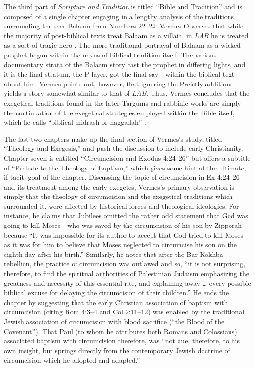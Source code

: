 The third part of \emph{Scripture and Tradition} is titled ``Bible and
Tradition'' and is composed of a single chapter engaging in a lengthy
analysis of the traditions surrounding the seer Balaam from Numbers
22--24. Vermes Observes that while the majority of post-biblical texts
treat Balaam as a villain, in \emph{LAB} he is treated as a sort of
tragic hero \autocite[173]{vermes1961}. The more traditional portrayal
of Balaam as a wicked prophet began within the nexus of biblical
tradition itself. The various documentary strata of the Balaam story
cast the prophet in differing lights, and it is the final stratum, the P
layer, got the final say---within the biblical text---about him. Vermes
points out, however, that ignoring the Preistly additions yields a story
somewhat similar to that of \emph{LAB}. Thus, Vermes concludes that the
exegetical traditions found in the later Targums and rabbinic works are
simply the continuation of the exegetical strategies employed within the
Bible itself, which he calls ``biblical midrash or haggadah''
\autocite[176]{vermes1961}.

The last two chapters make up the final section of Vermes's study,
titled ``Theology and Exegesis,'' and push the discussion to include
early Christianity. Chapter seven is entitled ``Circumcision and Exodus
4:24--26'' but offers a subtitle of ``Prelude to the Theology of
Baptism,'' which gives some hint at the ultimate, if tacit, goal of the
chapter. Discussing the topic of circumcision in Ex 4:24--26 and its
treatment among the early exegetes, Vermes's primary observation is
simply that the theology of circumcision and the exegetical traditions
which surrounded it, were affected by historical forces and theological
ideologies. For instance, he claims that Jubilees omitted the rather odd
statement that God was going to kill Moses---who was saved by the
circumcision of his son by Zipporah---because ``It was impossible for
its author to accept that God tried to kill Moses as it was for him to
believe that Moses neglected to circumcise his son on the eighth day
after his birth.''\autocite[185]{vermes1961} Similarly, he notes that
after the Bar Kokhba rebellion, the practice of circumcision was
outlawed and so, ``it is not surprising, therefore, to find the
spiritual authorities of Palestinian Judaism emphasizing the greatness
and necessity of this essential rite, and explaining away \ldots{} every
possible biblical excuse for delaying the circumcision of their
children.''\autocite[189]{vermes1961} He ends the chapter by suggesting
that the early Christian association of baptism with circumcision
(citing Rom 4:3--4 and Col 2:11--12) was enabled by the traditional
Jewish association of circumcision with blood sacrifice (``the Blood of
the Covenant'')\autocite[190]{vermes1961}. That Paul (to whom he
attributes both Romans and Colossians) associated baptism with
circumcision therefore, was ``not due, therefore, to his own insight,
but springs directly from the contemporary Jewish doctrine of
circumcision which he adopted and adapted.''\autocite[191]{vermes1961}

